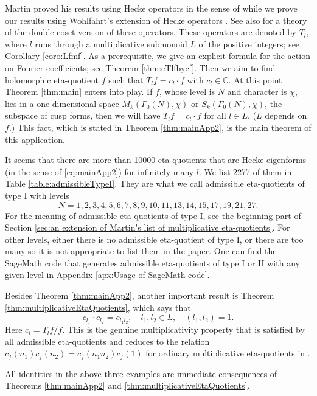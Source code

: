 \documentclass[12pt]{amsart}
\numberwithin{equation}{section}
\theoremstyle{plain}
\theoremstyle{definition}
\theoremstyle{remark}
\newcommand\numC{\mathbb{C}}
\begin{document}
Martin \cite{Mar96} proved his results using Hecke operators in the sense of \cite{AL70} while we prove our results using Wohlfahrt's extension of Hecke operators \cite{Woh57}. See also \cite[Section 3]{ZZ23} for a theory of the double coset version of these operators. These operators are denoted by $T_l$, where $l$ runs through a multiplicative submonoid $L$ of the positive integers; see Corollary \ref{coro:Lfmf}. As a prerequisite, we give an explicit formula for the action on Fourier coefficients; see Theorem \ref{thm:cTlfbycf}. Then we aim to find holomorphic eta-quotient $f$ such that $T_lf=c_l\cdot f$ with $c_l\in\numC$. At this point Theorem \ref{thm:main} enters into play. If $f$, whose level is $N$ and character is $\chi$, lies in a one-dimensional space $M_k(\Gamma_0(N),\chi)$ or $S_k(\Gamma_0(N),\chi)$, the subspace of cusp forms, then we will have $T_lf=c_l\cdot f$ for all $l\in L$. ($L$ depends on $f$.) This fact, which is stated in Theorem \ref{thm:mainApp2}, is the main theorem of this application.

It seems that there are more than 10000 eta-quotients that are Hecke eigenforms (in the sense of \eqref{eq:mainApp2}) for infinitely many $l$. We list 2277 of them in Table \ref{table:admissibleTypeI}. They are what we call admissible eta-quotients of type I with levels
$$
N=1,2,3,4,5,6,7,8,9,10,11,13,14,15,17,19,21,27.
$$
For the meaning of admissible eta-quotients of type I, see the beginning part of Section \ref{sec:an extension of Martin's list of multiplicative eta-quotients}. For other levels, either there is no admissible eta-quotient of type I, or there are too many so it is not appropriate to list them in the paper. One can find the SageMath code that generates admissible eta-quotients of type I or II with any given level in Appendix \ref{apx:Usage of SageMath code}.

Besides Theorem \ref{thm:mainApp2}, another important result is Theorem \ref{thm:multiplicativeEtaQuotients}, which says that
\begin{equation*}
c_{l_1}\cdot c_{l_2}=c_{l_1l_2},\quad l_1,l_2\in L,\quad(l_1,l_2)=1.
\end{equation*}
Here $c_l=T_lf/f$. This is the genuine multiplicativity property that is satisfied by all admissible eta-quotients and reduces to the relation $c_f(n_1)c_f(n_2)=c_f(n_1n_2)c_f(1)$ for ordinary multiplicative eta-quotients in \cite{Mar96}.

All identities in the above three examples are immediate consequences of Theorems \ref{thm:mainApp2} and \ref{thm:multiplicativeEtaQuotients}.
\end{document}
